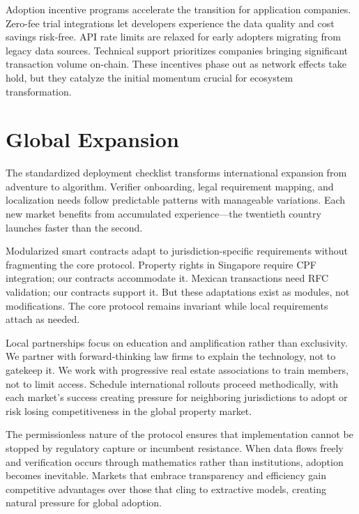 Adoption incentive programs accelerate the transition for application companies. Zero-fee trial integrations let developers experience the data quality and cost savings risk-free. API rate limits are relaxed for early adopters migrating from legacy data sources. Technical support prioritizes companies bringing significant transaction volume on-chain. These incentives phase out as network effects take hold, but they catalyze the initial momentum crucial for ecosystem transformation.

\section{Global Expansion}

The standardized deployment checklist transforms international expansion from adventure to algorithm. Verifier onboarding, legal requirement mapping, and localization needs follow predictable patterns with manageable variations. Each new market benefits from accumulated experience---the twentieth country launches faster than the second.

Modularized smart contracts adapt to jurisdiction-specific requirements without fragmenting the core protocol. Property rights in Singapore require CPF integration; our contracts accommodate it. Mexican transactions need RFC validation; our contracts support it. But these adaptations exist as modules, not modifications. The core protocol remains invariant while local requirements attach as needed.

Local partnerships focus on education and amplification rather than exclusivity. We partner with forward-thinking law firms to explain the technology, not to gatekeep it. We work with progressive real estate associations to train members, not to limit access. Schedule international rollouts proceed methodically, with each market's success creating pressure for neighboring jurisdictions to adopt or risk losing competitiveness in the global property market.

The permissionless nature of the protocol ensures that implementation cannot be stopped by regulatory capture or incumbent resistance. When data flows freely and verification occurs through mathematics rather than institutions, adoption becomes inevitable. Markets that embrace transparency and efficiency gain competitive advantages over those that cling to extractive models, creating natural pressure for global adoption.